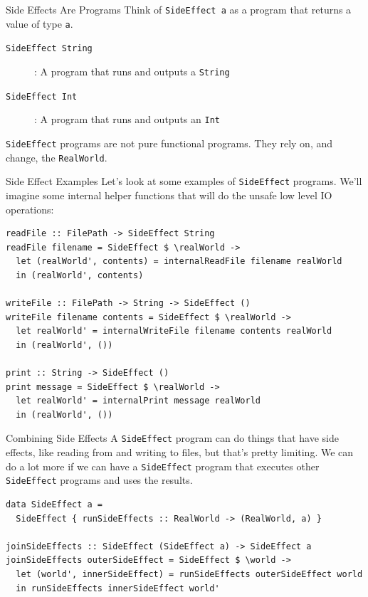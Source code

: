 \documentclass[10pt, presentation, colorlinks]{beamer}
\begin{document}
\begin{frame}[label={sec:org79ce505},fragile]{Side Effects Are Programs}
 Think of \texttt{SideEffect a} as a \alert{program} that returns a value of type
\texttt{a}.

\bigskip

\begin{description}
\item[{\texttt{SideEffect String}}] : A program that runs and outputs a \texttt{String}
\item[{\texttt{SideEffect Int}}] : A program that runs and outputs an \texttt{Int}
\end{description}

\bigskip

\texttt{SideEffect} programs are not pure functional programs. They rely on, and change, the \texttt{RealWorld}.
\end{frame}

\begin{frame}[label={sec:orgefb5d31},fragile]{Side Effect Examples}
 Let's look at some examples of \texttt{SideEffect} programs. We'll imagine
some internal helper functions that will do the unsafe low level IO
operations:

\begin{verbatim}
readFile :: FilePath -> SideEffect String
readFile filename = SideEffect $ \realWorld ->
  let (realWorld', contents) = internalReadFile filename realWorld
  in (realWorld', contents)

writeFile :: FilePath -> String -> SideEffect ()
writeFile filename contents = SideEffect $ \realWorld ->
  let realWorld' = internalWriteFile filename contents realWorld
  in (realWorld', ())

print :: String -> SideEffect ()
print message = SideEffect $ \realWorld ->
  let realWorld' = internalPrint message realWorld
  in (realWorld', ())
\end{verbatim}
\end{frame}

\begin{frame}[label={sec:org0a204ce},fragile]{Combining Side Effects}
 A \texttt{SideEffect} program can do things that have side effects, like
reading from and writing to files, but that's pretty limiting. We can
do a lot more if we can have a \texttt{SideEffect} program that executes
other \texttt{SideEffect} programs and uses the results.

\begin{verbatim}
data SideEffect a =
  SideEffect { runSideEffects :: RealWorld -> (RealWorld, a) }

joinSideEffects :: SideEffect (SideEffect a) -> SideEffect a
joinSideEffects outerSideEffect = SideEffect $ \world ->
  let (world', innerSideEffect) = runSideEffects outerSideEffect world
  in runSideEffects innerSideEffect world'
\end{verbatim}
\end{frame}
\end{document}
